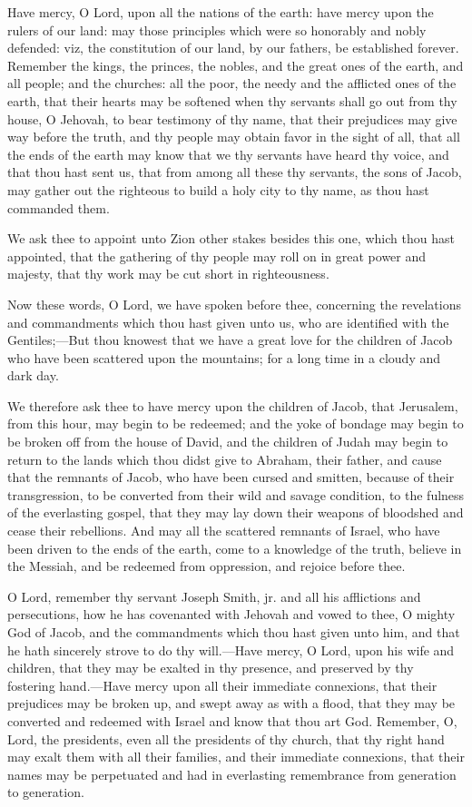 					Have mercy, O Lord, upon all the nations of the earth: have mercy upon the rulers of our land: may those principles which were so honorably and nobly defended: viz, the constitution of our land, by our fathers, be established forever. Remember the kings, the princes, the nobles, and the great ones of the earth, and all people; and the churches: all the poor, the needy and the afflicted ones of the earth, that their hearts may be softened when thy servants shall go out from thy house, O Jehovah, to bear testimony of thy name, that their prejudices may give way before the truth, and thy people may obtain favor in the sight of all, that all the ends of the earth may know that we thy servants have heard thy voice, and that thou hast sent us, that from among all these thy servants, the sons of Jacob, may gather out the righteous to build a holy city to thy name, as thou hast commanded them.

					We ask thee to appoint unto Zion other stakes besides this one, which thou hast appointed, that the gathering of thy people may roll on in great power and majesty, that thy work may be cut short in righteousness.

					Now these words, O Lord, we have spoken before thee, concerning the revelations and commandments which thou hast given unto us, who are identified with the Gentiles;---But thou knowest that we have a great love for the children of Jacob who have been scattered upon the mountains; for a long time in a cloudy and dark day.

					We therefore ask thee to have mercy upon the children of Jacob, that Jerusalem, from this hour, may begin to be redeemed; and the yoke of bondage may begin to be broken off from the house of David, and the children of Judah may begin to return to the lands which thou didst give to Abraham, their father, and cause that the remnants of Jacob, who have been cursed and smitten, because of their transgression, to be converted from their wild and savage condition, to the fulness of the everlasting gospel, that they may lay down their weapons of bloodshed and cease their rebellions. And may all the scattered remnants of Israel, who have been driven to the ends of the earth, come to a knowledge of the truth, believe in the Messiah, and be redeemed from oppression, and rejoice before thee.

					O Lord, remember thy servant Joseph Smith, jr. and all his afflictions and persecutions, how he has covenanted with Jehovah and vowed to thee, O mighty God of Jacob, and the commandments which thou hast given unto him, and that he hath sincerely strove to do thy will.---Have mercy, O Lord, upon his wife and children, that they may be exalted in thy presence, and preserved by thy fostering hand.---Have mercy upon all their immediate connexions, that their prejudices may be broken up, and swept away as with a flood, that they may be converted and redeemed with Israel and know that thou art God. Remember, O, Lord, the presidents, even all the presidents of thy church, that thy right hand may exalt them with all their families, and their immediate connexions, that their names may be perpetuated and had in everlasting remembrance from generation to generation.

